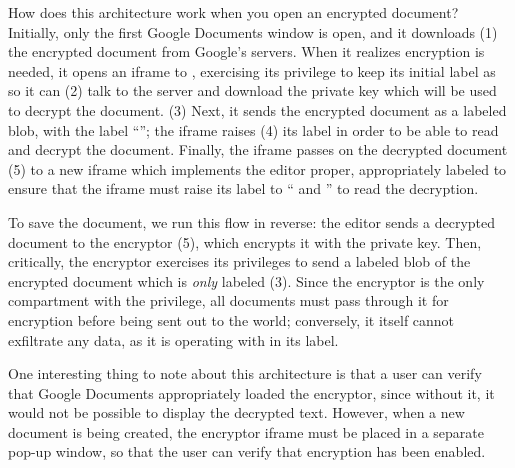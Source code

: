How does this architecture work when you open an encrypted document?  Initially, only the
first Google Documents window is open, and it downloads (1) the encrypted
document from Google's servers.  When it realizes encryption is needed,
it opens an iframe to , exercising its privilege to keep
its initial label as  so it can (2) talk to the 
server and download the private key which will be used to decrypt the
document.  (3) Next, it sends the encrypted document as a labeled blob,
with the label ``''; the iframe raises (4) its label in
order to be able to read and decrypt the document.  Finally, the iframe
passes on the decrypted document (5) to a new iframe which implements the
editor proper, appropriately labeled to ensure that the iframe must raise
its label to `` and '' to read the decryption.

To save the document, we run this flow in reverse: the editor sends a
decrypted document to the encryptor (5), which encrypts it with the
private key.  Then, critically, the encryptor exercises its privileges
to send a labeled blob of the encrypted document which is \emph{only}
labeled  (3).  Since the encryptor is the only compartment
with the  privilege, all documents must pass through it for
encryption before being sent out to the world; conversely, it itself cannot
exfiltrate any data, as it is operating with  in its label.

One interesting thing to note about this architecture is that a user can
verify that Google Documents appropriately loaded the encryptor, since
without it, it would not be possible to display the decrypted text.  However, when
a new document is being created, the encryptor iframe must be placed
in a separate pop-up window, so that the user can verify that encryption
has been enabled.

